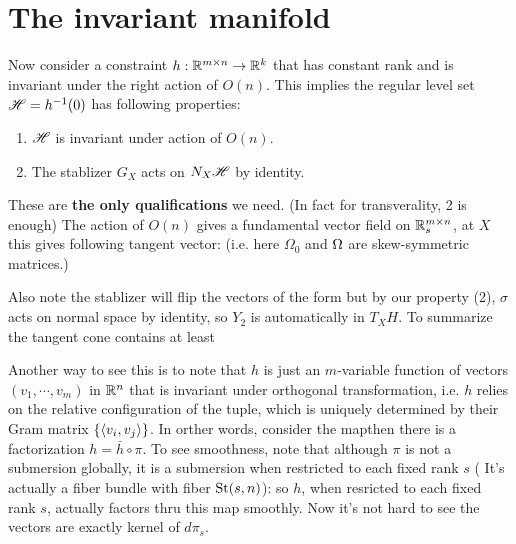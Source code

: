 \documentclass[]{note}
\begin{document}
\section{The invariant manifold}
Now consider a constraint $h:\mathbb{R}^{m\times n}\to \mathbb{R}^k$ that has constant rank and is invariant under the right action of $O(n)$. This implies the regular level set $\mathscr H=h^{-1}(0)$ has following properties:
\begin{enumerate}
    \item $\mathscr H$ is invariant under action of $O(n)$. 

    \item The stablizer $G_X$ acts on $N_X\mathscr H$ by identity. 
\end{enumerate}
These are \textbf{the only qualifications} we need. (In fact for transverality, 2 is enough)
The action of $O(n)$ gives a fundamental vector field on $\mathbb{R}_s^{m\times n}$, at $X$ this gives following tangent vector:
(i.e. here $\Omega_0$ and $\Omega$ are skew-symmetric matrices.)

Also note the stablizer 
will flip the vectors of the form but by our property (2), $\sigma$ acts on normal space by identity, so $Y_2$ is automatically in $T_XH$. 
To summarize the tangent cone contains at least


Another way to see this is to note that $h$ is just an $m$-variable function of vectors $(v_1,\cdots,v_m)$ in $\mathbb{R}^n$ that is invariant under orthogonal transformation, i.e. $h$ relies on the relative configuration of the tuple, which is uniquely determined by their Gram matrix $\left\{\braket{v_i,v_j}\right\}$. 
In orther words, consider the mapthen there is a factorization $h=\bar h\circ \pi$. To see smoothness, note that although
$\pi$ is not a submersion globally,  it is a submersion when restricted to each fixed rank $s$ ( It's actually a fiber bundle with fiber $\mathrm{St}(s,n)$): so $h$, when resricted to each fixed rank $s$, actually factors thru this map smoothly. Now it's not hard to see the vectors  are exactly kernel of $d\pi_s$. 
\end{document}
